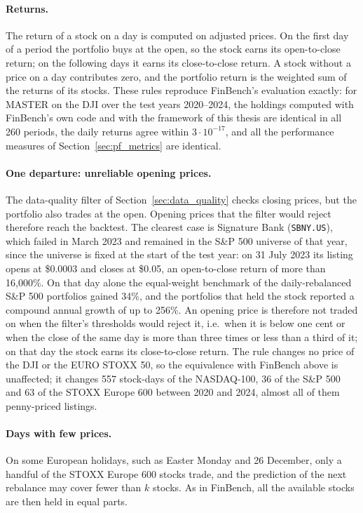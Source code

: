 \paragraph{Returns.} The return of a stock on a day is computed on adjusted prices. On the first day of a period the portfolio buys at the open, so the stock earns its open-to-close return; on the following days it earns its close-to-close return. A stock without a price on a day contributes zero, and the portfolio return is the weighted sum of the returns of its stocks. These rules reproduce FinBench's evaluation exactly: for MASTER on the DJI over the test years 2020--2024, the holdings computed with FinBench's own code and with the framework of this thesis are identical in all 260 periods, the daily returns agree within $3 \cdot 10^{-17}$, and all the performance measures of Section~\ref{sec:pf_metrics} are identical.

\paragraph{One departure: unreliable opening prices.} The data-quality filter of Section~\ref{sec:data_quality} checks closing prices, but the portfolio also trades at the open. Opening prices that the filter would reject therefore reach the backtest. The clearest case is Signature Bank (\texttt{SBNY.US}), which failed in March 2023 and remained in the S\&P 500 universe of that year, since the universe is fixed at the start of the test year: on 31 July 2023 its listing opens at \$0.0003 and closes at \$0.05, an open-to-close return of more than 16{,}000\%. On that day alone the equal-weight benchmark of the daily-rebalanced S\&P 500 portfolios gained 34\%, and the portfolios that held the stock reported a compound annual growth of up to 256\%. An opening price is therefore not traded on when the filter's thresholds would reject it, i.e.\ when it is below one cent or when the close of the same day is more than three times or less than a third of it; on that day the stock earns its close-to-close return. The rule changes no price of the DJI or the EURO STOXX 50, so the equivalence with FinBench above is unaffected; it changes 557 stock-days of the NASDAQ-100, 36 of the S\&P 500 and 63 of the STOXX Europe 600 between 2020 and 2024, almost all of them penny-priced listings.

\paragraph{Days with few prices.} On some European holidays, such as Easter Monday and 26 December, only a handful of the STOXX Europe 600 stocks trade, and the prediction of the next rebalance may cover fewer than $k$ stocks. As in FinBench, all the available stocks are then held in equal parts.

